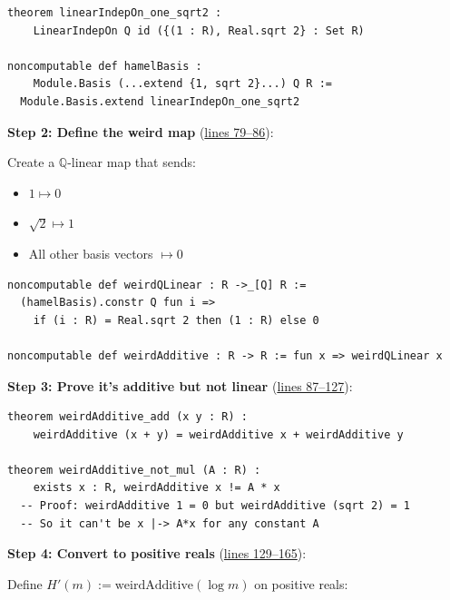 \documentclass[11pt]{article}
\theoremstyle{definition}
\theoremstyle{remark}
\begin{document}
\begin{lstlisting}[caption={Hamel basis extending $\{1, \sqrt{2}\}$}]
theorem linearIndepOn_one_sqrt2 :
    LinearIndepOn Q id ({(1 : R), Real.sqrt 2} : Set R)

noncomputable def hamelBasis :
    Module.Basis (...extend {1, sqrt 2}...) Q R :=
  Module.Basis.extend linearIndepOn_one_sqrt2
\end{lstlisting}

\textbf{Step 2: Define the weird map} (\href{https://github.com/zariuq/ks-foundations-of-inference/blob/main/KnuthSkilling/Counterexamples/CauchyPathology.lean}{lines 79--86}):

Create a $\mathbb{Q}$-linear map that sends:
\begin{itemize}
\item $1 \mapsto 0$
\item $\sqrt{2} \mapsto 1$
\item All other basis vectors $\mapsto 0$
\end{itemize}

\begin{lstlisting}[caption={Definition of weirdAdditive}]
noncomputable def weirdQLinear : R ->_[Q] R :=
  (hamelBasis).constr Q fun i =>
    if (i : R) = Real.sqrt 2 then (1 : R) else 0

noncomputable def weirdAdditive : R -> R := fun x => weirdQLinear x
\end{lstlisting}

\textbf{Step 3: Prove it's additive but not linear} (\href{https://github.com/zariuq/ks-foundations-of-inference/blob/main/KnuthSkilling/Counterexamples/CauchyPathology.lean}{lines 87--127}):

\begin{lstlisting}[caption={weirdAdditive satisfies Cauchy's equation but isn't linear}]
theorem weirdAdditive_add (x y : R) :
    weirdAdditive (x + y) = weirdAdditive x + weirdAdditive y

theorem weirdAdditive_not_mul (A : R) :
    exists x : R, weirdAdditive x != A * x
  -- Proof: weirdAdditive 1 = 0 but weirdAdditive (sqrt 2) = 1
  -- So it can't be x |-> A*x for any constant A
\end{lstlisting}

\textbf{Step 4: Convert to positive reals} (\href{https://github.com/zariuq/ks-foundations-of-inference/blob/main/KnuthSkilling/Counterexamples/CauchyPathology.lean}{lines 129--165}):

Define $H'(m) := \text{weirdAdditive}(\log m)$ on positive reals:
\end{document}
